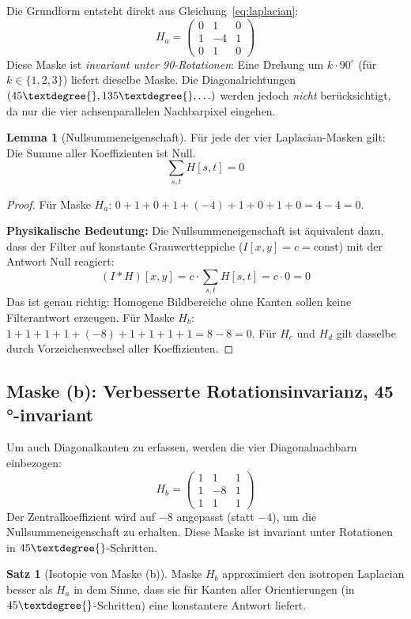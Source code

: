 ﻿\documentclass[a4paper,12pt]{article}
\theoremstyle{definition}
\newtheorem{satz}{Satz}
\newtheorem{lemma}{Lemma}
\begin{document}
Die Grundform entsteht direkt aus Gleichung~\eqref{eq:laplacian}:
\[
    H_a = \begin{pmatrix} 0 & 1 & 0 \\ 1 & -4 & 1 \\ 0 & 1 & 0 \end{pmatrix}
\]
Diese Maske ist \emph{invariant unter 90\textdegree{}-Rotationen}: Eine Drehung um $k \cdot 90^\circ$ (für
$k \in \{1,2,3\}$) liefert dieselbe Maske. Die Diagonalrichtungen $(45\textdegree{}, 135\textdegree{}, \ldots)$
werden jedoch \emph{nicht} berücksichtigt, da nur die vier achsenparallelen Nachbarpixel
eingehen.

\begin{lemma}[Nullsummeneigenschaft]
\label{lem:nullsumme}
    Für jede der vier Laplacian-Masken gilt: Die Summe aller Koeffizienten ist Null.
    \[
        \sum_{s,t} H[s,t] = 0
    \]
\end{lemma}

\begin{proof}
    Für Maske $H_a$: $0+1+0+1+(-4)+1+0+1+0 = 4-4 = 0$.

    \textbf{Physikalische Bedeutung:} Die Nullsummeneigenschaft ist äquivalent dazu, dass der
    Filter auf konstante Grauwertteppiche ($I[x,y] = c = \text{const}$) mit der Antwort Null
    reagiert:
    \[
        (I * H)[x,y] = c \cdot \sum_{s,t} H[s,t] = c \cdot 0 = 0
    \]
    Das ist genau richtig: Homogene Bildbereiche ohne Kanten sollen keine Filterantwort erzeugen.
    Für Maske $H_b$: $1+1+1+1+(-8)+1+1+1+1 = 8-8 = 0$. Für $H_c$ und $H_d$ gilt dasselbe
    durch Vorzeichenwechsel aller Koeffizienten. \qedhere
\end{proof}

\subsection{Maske (b): Verbesserte Rotationsinvarianz, 45 °-invariant}

Um auch Diagonalkanten zu erfassen, werden die vier Diagonalnachbarn einbezogen:
\[
    H_b = \begin{pmatrix} 1 & 1 & 1 \\ 1 & -8 & 1 \\ 1 & 1 & 1 \end{pmatrix}
\]
Der Zentralkoeffizient wird auf $-8$ angepasst (statt $-4$), um die Nullsummeneigenschaft
zu erhalten. Diese Maske ist invariant unter Rotationen in $45\textdegree{}$-Schritten.

\begin{satz}[Isotopie von Maske (b)]
\label{satz:isotrop}
    Maske $H_b$ approximiert den isotropen Laplacian besser als $H_a$ in dem Sinne, dass
    sie für Kanten aller Orientierungen (in $45\textdegree{}$-Schritten) eine konstantere Antwort liefert.
\end{satz}
\end{document}
